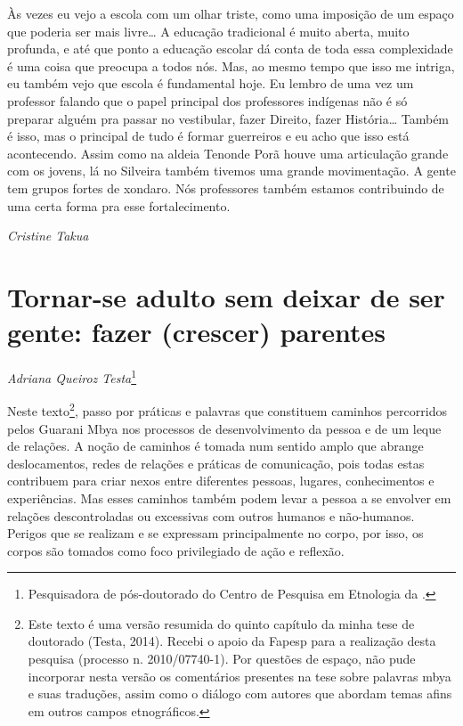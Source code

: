 Às vezes eu vejo a escola com um olhar triste, como uma imposição de um
espaço que poderia ser mais livre\ldots{} A educação tradicional é muito
aberta, muito profunda, e até que ponto a educação escolar dá conta de
toda essa complexidade é uma coisa que preocupa a todos nós. Mas, ao
mesmo tempo que isso me intriga, eu também vejo que escola é
fundamental hoje. Eu lembro de uma vez um professor falando que o papel
principal dos professores indígenas não é só preparar alguém pra passar
no vestibular, fazer Direito, fazer História\ldots{} Também é isso, mas o
principal de tudo é formar guerreiros e eu acho que isso está
acontecendo. Assim como na aldeia Tenonde Porã houve uma articulação
grande com os jovens, lá no Silveira também tivemos uma grande
movimentação. A gente tem grupos fortes de xondaro. Nós professores
também estamos contribuindo de uma certa forma pra esse fortalecimento.
\medskip
\begin{flushright}
\emph{Cristine Takua}
\end{flushright}

\chapter{Tornar-se adulto sem deixar de ser gente: fazer (crescer)
parentes}
\begin{flushright}
\emph{Adriana Queiroz Testa}\footnote{Pesquisadora de pós-doutorado do Centro
de Pesquisa em Etnologia da .}
\end{flushright}

Neste texto\footnote{Este texto é uma versão resumida do quinto capítulo
da minha tese de doutorado (Testa, 2014). Recebi o apoio da Fapesp para
a realização desta pesquisa (processo n. 2010/07740-1). Por questões de
espaço, não pude incorporar nesta versão os comentários presentes na
tese sobre palavras mbya e suas traduções, assim como o diálogo com
autores que abordam temas afins em outros campos etnográficos.}, passo
por práticas e palavras que constituem caminhos percorridos pelos
Guarani Mbya nos processos de desenvolvimento da pessoa e de um leque
de relações. A noção de caminhos é tomada num sentido amplo que abrange
deslocamentos, redes de relações e práticas de comunicação, pois todas
estas contribuem para criar nexos entre diferentes pessoas, lugares,
conhecimentos e experiências. Mas esses caminhos também podem levar a
pessoa a se envolver em relações descontroladas ou excessivas com
outros humanos e não-humanos. Perigos que se realizam e se expressam
principalmente no corpo, por isso, os corpos são tomados como foco
privilegiado de ação e reflexão.

